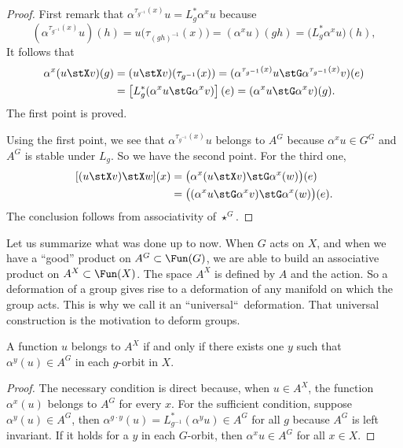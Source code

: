 \begin{proof}
First remark that $\alpha^{\tau_{g^{-1}}(x)}u=L^*_g\alpha^xu$ because
\[ 
(\alpha^{\tau_{g^{-1}}(x)}u)(h)=u\big(\tau_{(gh)^{-1}}(x)\big)=(\alpha^xu)(gh)
=\big(L^*_g\alpha^xu\big)(h),
\]
It follows that
\begin{equation}
\begin{split}
\alpha^x(u\stX v)(g)&=(u\stX v)(\tau_{g^{-1}}(x))
                    =(\alpha^{\tau_{g^{-1}}(x)}u\stG\alpha^{\tau_{g^{-1}}(x)}v) (e)\\
		    &=\left[ L^*_g(\alpha^xu\stG\alpha^xv) \right](e)
		    =(\alpha^xu\stG\alpha^xv)(g).
\end{split}
\end{equation}
The first point is proved.

Using the first point, we see that $\alpha^{\tau_{g^{-1}}(x)}u$ belongs to $A^G$ because $\alpha^xu\in G^G$ and $A^G$ is stable under $L_g$. So we have the second point.  For the third one,
\[ 
\begin{split}
[(u\stX v)\stX w](x)&=\big(\alpha^x(u\stX v)\stG\alpha^x(w)\big)(e)\\
                    &=\big((\alpha^xu\stG\alpha^xv)\stG\alpha^x(w)\big)(e).
\end{split}
\]
The conclusion follows from associativity of $\star^G$.
\end{proof}

Let us summarize what was done up to now. When $G$ acts on $X$, and when we have a ``good'' product on $A^G\subset\Fun(G)$, we are able to build an associative product on $A^X\subset\Fun(X)$. The space $A^X$ is defined by $A$ and the action. So a deformation of a group gives rise to a deformation of any manifold on which the group acts. This is why we call it an ``universal``\ deformation. That universal construction is the motivation to deform groups.

\begin{lemma}   
A function $u$ belongs to $A^{X}$ if and only if there exists one $y$ such that $\alpha^y(u)\in A^G$ in each $g$-orbit in $X$.
		\label{LemUnPtParOrbite}
\end{lemma}

\begin{proof}
The necessary condition is direct because, when $u\in A^X$, the function $\alpha^x(u)$ belongs to $A^G$ for every $x$. For the sufficient condition, suppose $\alpha^y(u)\in A^{G}$, then $\alpha^{g\cdot y}(u)=L_{g^{-1}}^*(\alpha^yu)\in A^{G}$ for all $g$ because $A^{G}$ is left invariant. If it holds for a $y$ in each $G$-orbit, then $\alpha^xu\in A^{G}$ for all $x\in X$.
\end{proof}

